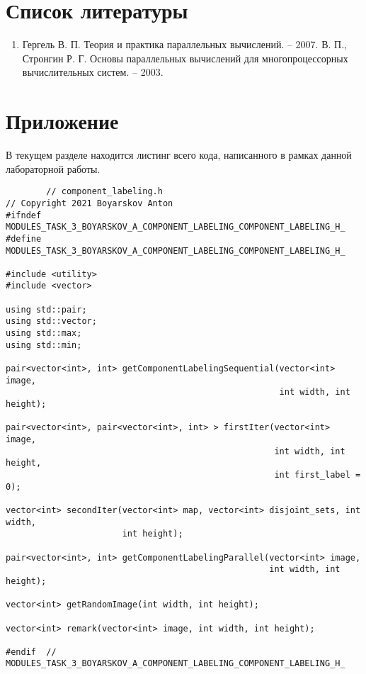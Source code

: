 \documentclass{report}
\begin{document}
\section*{Список литературы}
\begin{enumerate}
\item Гергель В. П. Теория и практика параллельных вычислений. – 2007.
 В. П., Стронгин Р. Г. Основы параллельных вычислений для многопроцессорных вычислительных систем. – 2003.

\end{enumerate} 
\newpage

	\section*{Приложение}
	\par В текущем разделе находится листинг всего кода, написанного в рамках данной лабораторной работы.
	\begin{lstlisting}
		// component_labeling.h
// Copyright 2021 Boyarskov Anton
#ifndef MODULES_TASK_3_BOYARSKOV_A_COMPONENT_LABELING_COMPONENT_LABELING_H_
#define MODULES_TASK_3_BOYARSKOV_A_COMPONENT_LABELING_COMPONENT_LABELING_H_

#include <utility>
#include <vector>

using std::pair;
using std::vector;
using std::max;
using std::min;

pair<vector<int>, int> getComponentLabelingSequential(vector<int> image,
                                                      int width, int height);

pair<vector<int>, pair<vector<int>, int> > firstIter(vector<int> image,
                                                     int width, int height,
                                                     int first_label = 0);

vector<int> secondIter(vector<int> map, vector<int> disjoint_sets, int width,
                       int height);

pair<vector<int>, int> getComponentLabelingParallel(vector<int> image,
                                                    int width, int height);

vector<int> getRandomImage(int width, int height);

vector<int> remark(vector<int> image, int width, int height);

#endif  // MODULES_TASK_3_BOYARSKOV_A_COMPONENT_LABELING_COMPONENT_LABELING_H_
	\end{lstlisting}
\end{document}
